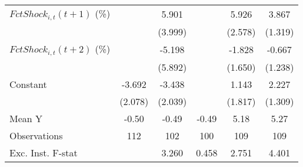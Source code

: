 {\begin{tabular}{l*{5}{c}}
\addlinespace
$ FctShock_{i,t}(t+1)$ (\%)&                     &       5.901         &                     &       5.926\sym{**} &       3.867\sym{**} \\
                    &                     &     (3.999)         &                     &     (2.578)         &     (1.319)         \\
\addlinespace
$ FctShock_{i,t}(t+2)$ (\%)&                     &      -5.198         &                     &      -1.828         &      -0.667         \\
                    &                     &     (5.892)         &                     &     (1.650)         &     (1.238)         \\
\addlinespace
Constant            &      -3.692\sym{*}  &      -3.438         &                     &       1.143         &       2.227         \\
                    &     (2.078)         &     (2.039)         &                     &     (1.817)         &     (1.309)         \\
\midrule
Mean Y              &       -0.50         &       -0.49         &       -0.49         &        5.18         &        5.27         \\
Observations        &         112         &         102         &         100         &         109         &         109         \\
Exc. Inst. F-stat   &                     &       3.260         &       0.458         &       2.751         &       4.401         \\
\bottomrule
\end{tabular}
}
